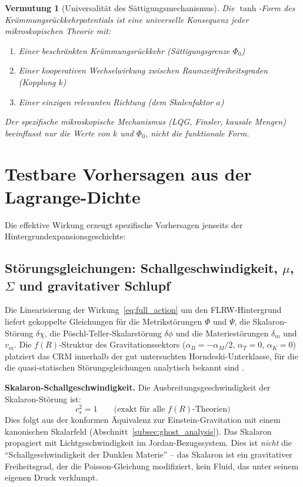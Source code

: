 \documentclass[11pt,a4paper]{article}
\newtheorem{conjecture}{Vermutung}
\begin{document}
\begin{conjecture}[Universalit\"at des S\"attigungsmechanismus]
Die $\tanh$-Form des Kr\"ummungsr\"uckkehrpotentials ist eine \textit{universelle} Konsequenz jeder mikroskopischen Theorie mit:
\begin{enumerate}
\item Einer beschr\"ankten Kr\"ummungsr\"uckkehr (S\"attigungsgrenze $\Phi_0$)
\item Einer kooperativen Wechselwirkung zwischen Raumzeitfreiheitsgraden (Kopplung $k$)
\item Einer einzigen relevanten Richtung (dem Skalenfaktor $a$)
\end{enumerate}
Der spezifische mikroskopische Mechanismus (LQG, Finsler, kausale Mengen) beeinflusst nur die Werte von $k$ und $\Phi_0$, nicht die funktionale Form.
\end{conjecture}


\section{Testbare Vorhersagen aus der Lagrange-Dichte}
\label{sec:predictions}

Die effektive Wirkung erzeugt spezifische Vorhersagen jenseits der Hintergrundexpansionsgeschichte:

\subsection{St\"orungsgleichungen: Schallgeschwindigkeit, $\mu$, $\Sigma$ und gravitativer Schlupf}
\label{subsec:perturbation_physics}

Die Linearisierung der Wirkung~\eqref{eq:full_action} um den FLRW-Hintergrund liefert gekoppelte Gleichungen f\"ur die Metrikst\"orungen $\Phi$ und $\Psi$, die Skalaron-St\"orung $\delta\chi$, die P\"oschl-Teller-Skalarst\"orung $\delta\phi$ und die Materiest\"orungen $\delta_m$ und $v_m$. Die $f(R)$-Struktur des Gravitationssektors ($\alpha_B = -\alpha_M/2$, $\alpha_T = 0$, $\alpha_K = 0$) platziert das CRM innerhalb der gut untersuchten Horndeski-Unterklasse, f\"ur die die quasi-statischen St\"orungsgleichungen analytisch bekannt sind \cite{Bellini2014}.

\textbf{Skalaron-Schallgeschwindigkeit.} Die Ausbreitungsgeschwindigkeit der Skalaron-St\"orung ist:
\begin{equation}
c_s^2 = 1 \qquad \text{(exakt f\"ur alle $f(R)$-Theorien)}
\end{equation}
Dies folgt aus der konformen \"Aquivalenz zur Einstein-Gravitation mit einem kanonischen Skalarfeld (Abschnitt~\ref{subsec:ghost_analysis}). Das Skalaron propagiert mit Lichtgeschwindigkeit im Jordan-Bezugssystem. Dies ist \textit{nicht} die "`Schallgeschwindigkeit der Dunklen Materie"' -- das Skalaron ist ein gravitativer Freiheitsgrad, der die Poisson-Gleichung modifiziert, kein Fluid, das unter seinem eigenen Druck verklumpt.
\end{document}
